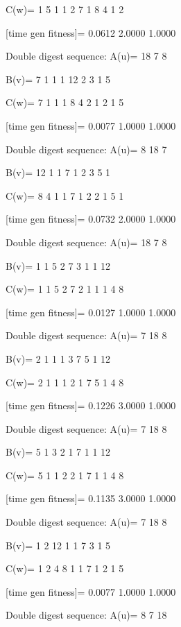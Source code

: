 C(w)=
     1     5     1     1     2     7     1     8     4     1     2

[time gen fitness]=
    0.0612    2.0000    1.0000

Double digest sequence:
A(u)=
    18     7     8

B(v)=
     7     1     1     1    12     2     3     1     5

C(w)=
     7     1     1     1     8     4     2     1     2     1     5

[time gen fitness]=
    0.0077    1.0000    1.0000

Double digest sequence:
A(u)=
     8    18     7

B(v)=
    12     1     1     7     1     2     3     5     1

C(w)=
     8     4     1     1     7     1     2     2     1     5     1

[time gen fitness]=
    0.0732    2.0000    1.0000

Double digest sequence:
A(u)=
    18     7     8

B(v)=
     1     1     5     2     7     3     1     1    12

C(w)=
     1     1     5     2     7     2     1     1     1     4     8

[time gen fitness]=
    0.0127    1.0000    1.0000

Double digest sequence:
A(u)=
     7    18     8

B(v)=
     2     1     1     1     3     7     5     1    12

C(w)=
     2     1     1     1     2     1     7     5     1     4     8

[time gen fitness]=
    0.1226    3.0000    1.0000

Double digest sequence:
A(u)=
     7    18     8

B(v)=
     5     1     3     2     1     7     1     1    12

C(w)=
     5     1     1     2     2     1     7     1     1     4     8

[time gen fitness]=
    0.1135    3.0000    1.0000

Double digest sequence:
A(u)=
     7    18     8

B(v)=
     1     2    12     1     1     7     3     1     5

C(w)=
     1     2     4     8     1     1     7     1     2     1     5

[time gen fitness]=
    0.0077    1.0000    1.0000

Double digest sequence:
A(u)=
     8     7    18

